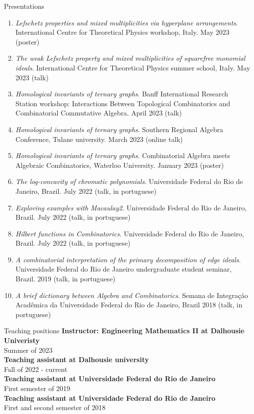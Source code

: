 \documentclass[12pt]{resume} %
\begin{document}
\begin{rSection}{Presentations}
\begin{enumerate}
        \item \textit{Lefschetz properties and mixed multiplicities via hyperplane arrangements}. International Centre for Theoretical Physics workshop, Italy. May 2023 (poster)
        \item \textit{The weak Lefschetz property and mixed multiplicities of squarefree monomial ideals}. International Centre for Theoretical Physics summer school, Italy. May 2023 (talk)
        \item \textit{Homological invariants of ternary graphs}. Banff International Research Station workshop: Interactions Between Topological Combinatorics and Combinatorial Commutative Algebra. April 2023 (talk)
        \item \textit{Homological invariants of ternary graphs}. Southern Regional Algebra Conference, Tulane university. March 2023 (online talk)
        \item \textit{Homological invariants of ternary graphs}. Combinatorial Algebra meets Algebraic Combinatorics, Waterloo University. January 2023 (poster)
        \item \textit{The log-concavity of chromatic polynomials}. Universidade Federal do Rio de Janeiro, Brazil. July 2022 (talk, in portuguese)
        \item \textit{Exploring examples with Macaulay2}. Universidade Federal do Rio de Janeiro, Brazil. July 2022 (talk, in portuguese)
        \item \textit{Hilbert functions in Combinatorics}. Universidade Federal do Rio de Janeiro, Brazil. July 2022 (talk, in portuguese)
        \item \textit{A combinatorial interpretation of the primary decomposition of edge ideals}. Universidade Federal do Rio de Janeiro undergraduate student seminar, Brazil. 2019 (talk, in portuguese)
        \item \textit{A brief dictionary between Algebra and Combinatorics}. Semana de Integração Acadêmica da Universidade Federal do Rio de Janeiro, Brazil 2018 (talk, in portuguese)
    \end{enumerate}
\end{rSection}


\begin{rSection}{Teaching positions}
    {\bf Instructor: Engineering Mathematics II at Dalhousie Univeristy}
    \\
    Summer of 2023
    \\
    {\bf Teaching assistant at Dalhousie university}
    \\
    Fall of 2022 - current
    \\
    {\bf Teaching assistant at Universidade Federal do Rio de Janeiro} 
    \\
    First semester of 2019
    \\
    {\bf Teaching assistant at Universidade Federal do Rio de Janeiro} 
    \\
    First and second semester of 2018
    \\
        
\end{rSection}
\end{document}
